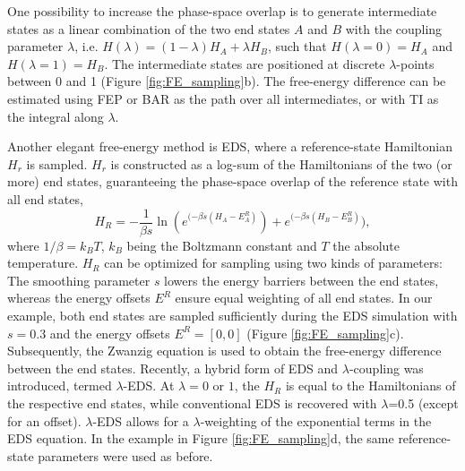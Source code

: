 %
One possibility to increase the phase-space overlap is to generate intermediate states as a linear combination of the two end states $A$ and $B$ with the coupling parameter $\lambda$, i.e. $H(\lambda) = (1-\lambda) H_A + \lambda H_B$, such that $H(\lambda=0) = H_A$ and $H(\lambda=1) = H_B$.
The intermediate states are positioned at discrete $\lambda$-points between 0 and 1 (Figure \ref{fig:FE_sampling}b).\cite{Valleau1972, Straatsma1991} 
The free-energy difference can be estimated using FEP\cite{Zwanzig1954} or BAR\cite{Bennett1976} as the path over all intermediates, or with TI\cite{Kirkwood1935} as the integral along $\lambda$. 

Another elegant free-energy method is EDS,\cite{Christ2007, Christ2008} where a reference-state Hamiltonian $H_r$ is sampled. $H_r$ is constructed as a log-sum of the Hamiltonians of the two (or more) end states, guaranteeing the phase-space overlap of the reference state with all end states,
\begin{equation}
H_R = - \frac{1}{\beta s} \ln( e^{(- \beta s (H_A - E^R_A)}) +e^{(- \beta s (H_B - E^R_B)}),
\end{equation}
where $1/\beta=k_{B}T$, $k_B$ being the Boltzmann constant and $T$ the absolute temperature.
$H_R$ can be optimized for sampling using two kinds of parameters: The smoothing parameter $s$ lowers the energy barriers between the end states, whereas the energy offsets $E^R$ ensure equal weighting of all end states. In our example, both end states are sampled sufficiently during the EDS simulation with $s=0.3$ and the energy offsets $E^R=[0,0]$ (Figure \ref{fig:FE_sampling}c). Subsequently, the Zwanzig equation\cite{Zwanzig1954} is used to obtain the free-energy difference between the end states.\cite{Christ2007, Christ2008}
Recently, a hybrid form of EDS and $\lambda$-coupling was introduced, termed $\lambda$-EDS.\cite{Koenig2020} At $\lambda=0$ or $1$, the $H_R$ is equal to the Hamiltonians of the respective end states, while conventional EDS is recovered with $\lambda$=0.5 (except for an offset).\cite{Koenig2020}
$\lambda$-EDS allows for a $\lambda$-weighting of the exponential terms in the EDS equation. In the example in Figure \ref{fig:FE_sampling}d, the same reference-state parameters were used as before.

